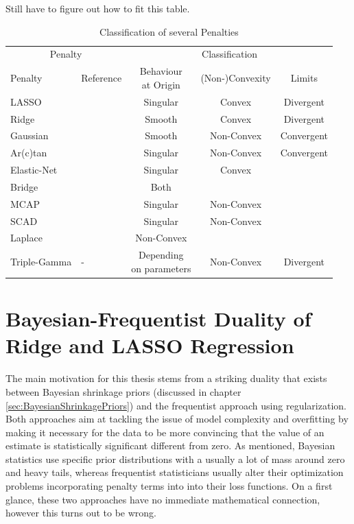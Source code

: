 \documentclass[12pt,a4paper]{article}
\newenvironment{lightbluebox}{%
    \begin{tcolorbox}[colback=lightblue, colframe=lightblue, fontupper=\itshape]%
}{%
    \end{tcolorbox}%
}
\begin{document}
\begin{lightbluebox}
Still have to figure out how to fit this table.
\end{lightbluebox}    

\begin{table}[!h]
\begin{center}
\begin{tabular}{llccc}\toprule
 \multicolumn{2}{c}{Penalty} & \multicolumn{3}{c}{Classification}\\
		\cmidrule(r{4pt}){1-2} \cmidrule(l){3-5}
Penalty     	& Reference  & \makecell{Behaviour\\ at Origin} & (Non-)Convexity & Limits\\\midrule

LASSO 	& \textcite{Tibishirani1996}	& Singular	&	Convex 	& Divergent\\
Ridge 	& \textcite{HoerlKennard1970a}	& Smooth		& Convex			& Divergent\\
Gaussian & \textcite{JohnVettamWu2022}	& Smooth		& Non-Convex 	& Convergent\\
Ar(c)tan 	& \textcite{WangZhu2016}	& Singular 	& Non-Convex 	& Convergent\\
Elastic-Net & \textcite{ZouHastie2005} & Singular & Convex &\\
Bridge & \textcite{FrankFriedman1993}& Both &&\\
MCAP & \textcite{Zhang2010}& Singular & Non-Convex &\\
SCAD & \textcite{FanLi2001} & Singular & Non-Convex &\\
Laplace & \textcite{TrzaskoManduca2009} & Non-Convex &&\\
Triple-Gamma & - & \makecell{Depending\\ on parameters} & Non-Convex & Divergent \\

\end{tabular}
\caption{Classification of several Penalties}
\label{tab:ClassificationOfPenalties}
\end{center}
\end{table}
 
\section{Bayesian-Frequentist Duality of Ridge and LASSO Regression}

The main motivation for this thesis stems from a striking duality that exists between Bayesian shrinkage priors (discussed in chapter \ref{sec:BayesianShrinkagePriors}) and the frequentist approach using regularization. Both approaches aim at tackling the issue of model complexity and overfitting by making it necessary for the data to be more convincing that the value of an estimate is statistically significant different from zero. As mentioned, Bayesian statistics use specific prior distributions with a usually a lot of mass around zero and heavy tails, whereas frequentist statisticians usually alter their optimization problems incorporating penalty terms into into their loss functions. On a first glance, these two approaches have no immediate mathematical connection, however this turns out to be wrong.\\
\end{document}
